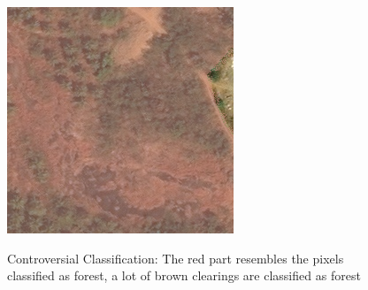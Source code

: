 \begin{figure}
  \begin{center}
  \label{badimg2}
  \includegraphics[width=.4\linewidth]{images/satellite_images/10_overlap}
  \caption{Controversial Classification: The red part resembles the pixels classified as forest, a lot of brown clearings are classified as forest}
  \end{center}
\end{figure}
